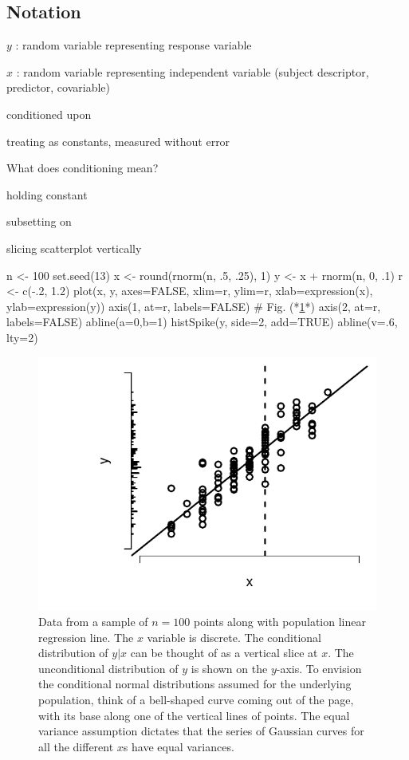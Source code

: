 \subsection{Notation}
\bi
\item $y$ : random variable representing response variable
\item $x$ : random variable representing independent variable (subject
  descriptor, predictor, covariable)
  \bi
  \item conditioned upon
  \item treating as constants, measured without error
  \ei
\item What does conditioning mean?
  \bi
  \item holding constant
  \item subsetting on
  \item slicing scatterplot vertically
  \ei
\begin{Schunk}
\begin{Sinput}
n <- 100
set.seed(13)
x <- round(rnorm(n, .5, .25), 1)
y <- x + rnorm(n, 0, .1)
r <- c(-.2, 1.2)
plot(x, y, axes=FALSE, xlim=r, ylim=r, xlab=expression(x), ylab=expression(y))
axis(1, at=r, labels=FALSE)     # Fig. (*\ref{fig:reg-simple-linear-reg}*)
axis(2, at=r, labels=FALSE)
abline(a=0,b=1)
histSpike(y, side=2, add=TRUE)
abline(v=.6, lty=2)
\end{Sinput}
\begin{figure}[htbp]

\centerline{\includegraphics{reg-simple-linear-reg-1} }

\caption[Sample of $n=100$ points with a linear regression line]{Data from a sample of $n=100$ points along with population linear regression line.  The $x$ variable is discrete.  The conditional distribution of $y | x$ can be thought of as a vertical slice at $x$.  The unconditional distribution of $y$ is shown on the $y$-axis.  To envision the conditional normal distributions assumed for the underlying population, think of a bell-shaped curve coming out of the page, with its base along one of the vertical lines of points.  The equal variance assumption dictates that the series of Gaussian curves for all the different $x$s have equal variances.}\label{fig:reg-simple-linear-reg}
\end{figure}
\end{Schunk}
